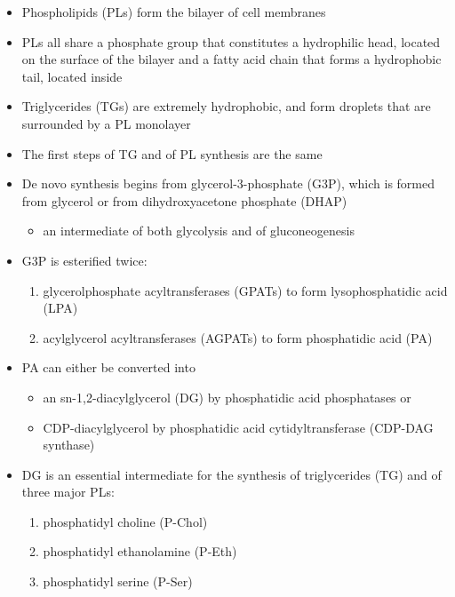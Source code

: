 \documentclass{scrartcl}
\begin{document}
\begin{itemize}
\item Phospholipids (PLs) form the bilayer of cell membranes
\item PLs all share a phosphate group that constitutes a hydrophilic head,
located on the surface of the bilayer and a fatty acid chain that
forms a hydrophobic tail, located inside
\item Triglycerides (TGs) are extremely hydrophobic, and form droplets
that are surrounded by a PL monolayer
\item The first steps of TG and of PL synthesis are the same
\item De novo synthesis begins from glycerol-3-phosphate (G3P), which is formed from glycerol or from dihydroxyacetone phosphate (DHAP)
\begin{itemize}
\item an intermediate of both glycolysis and of gluconeogenesis
\end{itemize}
\item G3P is esterified twice:
\begin{enumerate}
\item glycerolphosphate acyltransferases (GPATs) to form lysophosphatidic acid (LPA)
\item acylglycerol acyltransferases (AGPATs) to form phosphatidic acid (PA)
\end{enumerate}
\item PA can either be converted into
\begin{itemize}
\item an sn-1,2-diacylglycerol (DG) by phosphatidic acid phosphatases or
\item CDP-diacylglycerol by phosphatidic acid cytidyltransferase (CDP-DAG synthase)
\end{itemize}
\item DG is an essential intermediate for the synthesis of triglycerides (TG) and of three major PLs:
\begin{enumerate}
\item phosphatidyl choline (P-Chol)
\item phosphatidyl ethanolamine (P-Eth)
\item phosphatidyl serine (P-Ser)
\end{enumerate}
\end{itemize}
\end{document}
